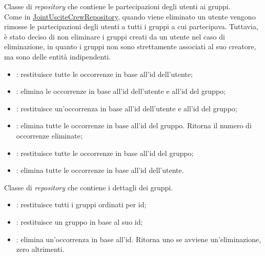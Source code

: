 \label{JointUtentiCrewRepository}
Classe di \textit{repository} che contiene le partecipazioni degli utenti ai
gruppi. \\
Come in \hyperref[JointUsciteCrewRepository]{JointUsciteCrewRepository}, quando
viene eliminato un utente vengono rimosse le partecipazioni degli utenti a
tutti i gruppi a cui partecipava. Tuttavia, è stato deciso di non eliminare i
gruppi creati da un utente nel caso di eliminazione, in quanto i gruppi non
sono strettamente associati al suo creatore, ma sono delle entità indipendenti.
\begin{itemize}
    \item {}:
          restituisce tutte le occorrenze in base all'id dell'utente;
    \item {}:
          elimina le occorrenze in base all'id dell'utente e all'id del gruppo;
    \item {}: restituisce un'occorrenza in base all'id dell'utente e
          all'id del
          gruppo;
    \item {}: elimina tutte le occorrenze
          in base all'id del gruppo. Ritorna il numero di occorrenze eliminate;
    \item {}: restituisce
          tutte le occorrenze in base all'id del gruppo;
    \item {}: elimina tutte le
          occorrenze in base all'id dell'utente.

\end{itemize}

\label{CrewRepository}
Classe di \textit{repository} che contiene i dettagli dei gruppi. \\
\begin{itemize}
    \item {}: restituisce tutti i gruppi
          ordinati per id;
    \item {}: restituisce un gruppo in base al suo
          id;
    \item {}: elimina un'occorrenza in base
          all'id. Ritorna uno se avviene un'eliminazione, zero altrimenti.
\end{itemize}

